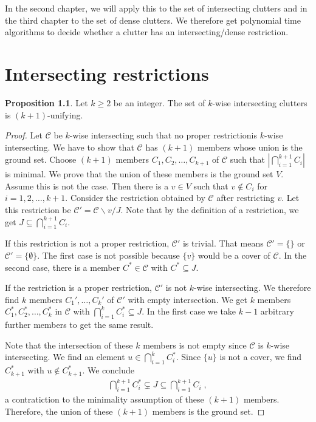 \documentclass[a4paper, 12pt, twoside=false]{scrbook}
\theoremstyle{definition}
\newtheorem{proposition}{Proposition}
\begin{document}
   In the second chapter, we will apply this to the set of intersecting clutters and in the third chapter to the set of dense clutters.
   We therefore get polynomial time algorithms to decide whether a clutter has an intersecting/dense restriction.

   \chapter{Intersecting restrictions}
   \begin{proposition}
       Let $k\geq 2$ be an integer.
       The set of $k$-wise intersecting clutters is $(k+1)$-unifying.
   \end{proposition}

   \begin{proof}
       Let $\mathcal{C}$ be $k$-wise intersecting such that no proper restrictionis $k$-wise intersecting.
       We have to show that $\mathcal{C}$ has $(k+1)$ members whose union is the ground set.
       Choose $(k+1)$ members $C_1, C_2, \ldots, C_{k+1}$ of $\mathcal{C}$ such that $|\bigcap_{i=1}^{k+1} C_i|$ is minimal.
       We prove that the union of these members is the ground set $V$.
       Assume this is not the case.
       Then there is a $v \in V$ such that $v \not\in C_i$ for $i=1,2, \ldots, k+1$.
       Consider the restriction obtained by $\mathcal{C}$ after restricting $v$.
       Let this restriction be $\mathcal{C'}=\mathcal{C} \backslash v / J$.
       Note that by the definition of a restriction, we get $J \subseteq \bigcap_{i=1}^{k+1} C_i$.

       If this restriction is not a proper restriction, $\mathcal{C'}$ is trivial.
       That means $\mathcal{C'}=\{\}$ or $\mathcal{C'}=\{\emptyset\}$.
       The first case is not possible because $\{v\}$ would be a cover of $\mathcal{C}$.
       In the second case, there is a member $C^* \in \mathcal{C}$ with $C^* \subseteq J$.

       If the restriction is a proper restriction, $\mathcal{C'}$ is not $k$-wise intersecting. We therefore find $k$ members $C_1',\ldots, C_k'$ of $\mathcal{C'}$ with empty intersection. We get $k$ members $C_1^*, C_2^*,\ldots, C_k^*$ in $\mathcal{C}$ with $\bigcap_{i=1}^k C_i^* \subseteq J$.
       In the first case we take $k-1$ arbitrary further members to get the same result.

       Note that the intersection of these $k$ members is not empty since $\mathcal{C}$ is $k$-wise intersecting.
       We find an element $u \in \bigcap_{i=1}^k C_i^*$. Since $\{u\}$ is not a cover, we find $C_{k+1}^*$ with $u \not\in C_{k+1}^*$.
       We conclude
       \begin{align*}
           \bigcap_{i=1}^{k+1} C_i^* \subsetneq J \subseteq \bigcap_{i=1}^{k+1} C_i \;,
       \end{align*}
       a contratiction to the minimality assumption of these $(k+1)$ members.
       Therefore, the union of these $(k+1)$ members is the ground set.


   \end{proof}
\end{document}
